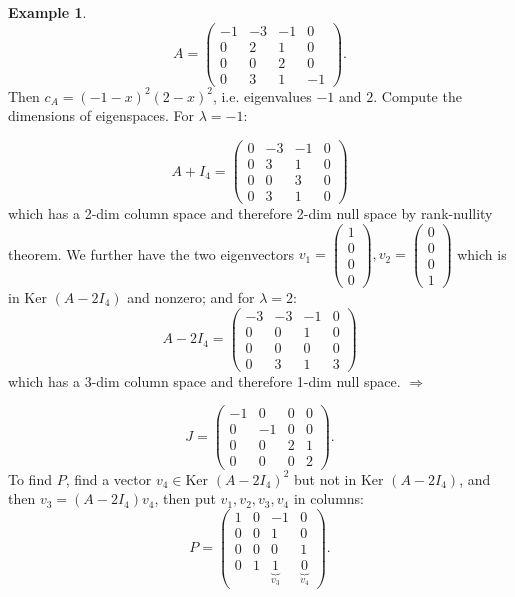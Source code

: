 \documentclass[a4paper]{article}
\newcommand{\Ker}{\text{Ker }}
\theoremstyle{definition}
\newtheorem{example}[defn]{Example}
\begin{document}
\begin{example}
\[
A=\begin{pmatrix}
-1 & -3 & -1 & 0\\ 0 & 2 & 1 & 0\\ 0 & 0 & 2 & 0\\ 0 & 3 & 1 & -1
\end{pmatrix} .
\]
Then $c_{A}=(-1-x)^2 (2-x)^2$, i.e. eigenvalues $-1$ and $2$. Compute the dimensions of eigenspaces. For $\lambda=-1$:

\[
A+I_4=\begin{pmatrix}
0 & -3 & -1 & 0\\ 0 & 3 & 1 & 0\\ 0 & 0 & 3 & 0\\ 0 & 3 & 1 & 0
\end{pmatrix}
\]
which has a 2-dim column space and therefore 2-dim null space by rank-nullity theorem. We further have the two eigenvectors $v_1=\begin{pmatrix}1\\0\\0\\0\end{pmatrix},v_2=\begin{pmatrix}0\\0\\0\\1\end{pmatrix}$ which is in $\Ker (A-2I_4)$ and nonzero; and for $\lambda=2$:
\[
A-2I_4=\begin{pmatrix}
-3 & -3 & -1 & 0\\ 0 & 0 & 1 & 0\\ 0 & 0 & 0 & 0\\ 0 & 3 & 1 & 3
\end{pmatrix}
\]
which has a 3-dim column space and therefore 1-dim null space. $\Rightarrow$

\[
J=\begin{pmatrix}
-1 & 0 & 0 & 0\\ 0 & -1 & 0 & 0\\ 0 & 0 & 2 & 1\\ 0 & 0 & 0 & 2
\end{pmatrix} .
\]
To find $P$, find a vector $v_4\in \Ker (A-2I_4)^2$ but not in $\Ker (A-2I_4)$, and then $v_3=(A-2I_4)v_4$, then put $v_1,v_2,v_3,v_4$ in columns:
\[
P=\begin{pmatrix}
1 & 0 & -1 & 0\\ 0 & 0 & 1 & 0\\ 0 & 0 & 0 & 1\\ 0 & 1 & \underbrace{1}_{v_3} & \underbrace{0}_{v_4}
\end{pmatrix} .
\]
\end{example}
\end{document}
